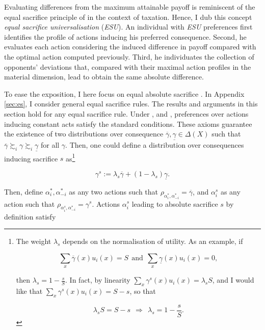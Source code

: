 Evaluating differences from the maximum attainable payoff is reminiscent of the equal sacrifice principle of \cite{mill1885principles} in the context of taxation. Hence, I dub this concept \textit{equal sacrifice universalisation} (\textit{ESU}). An individual with \textit{ESU} preferences first identifies the profile of actions inducing his preferred consequence. Second, he  evaluates each action considering the induced difference in payoff compared with the optimal action computed previously. Third, he individuates the collection of opponents' deviations that, compared with their maximal action profiles in the material dimension, lead to obtain the same absolute difference.

To ease the exposition, I here focus on equal absolute sacrifice \citep{youngDistributiveJusticeTaxation1988}. In Appendix \ref{sec:es}, I consider general equal sacrifice rules. The results and arguments in this section hold for any equal sacrifice rule. Under ,  and , preferences over actions inducing constant acts satisfy the standard \citeauthor{anscombeDefinitionSubjectiveProbability1963} conditions. These axioms guarantee the existence of two distributions over consequence \( \overline{\gamma}, \underline{\gamma} \in \Delta (X) \) such that \( \overline{\gamma} \succsim_i \gamma \succsim_i \underline{\gamma} \) for all \( \gamma \). Then, one could define a distribution over consequences inducing sacrifice \( s \) as\footnote{The weight \( \lambda_s \) depends on the normalisation of utility. As an example, if

	\[
		\sum_{x} \overline{\gamma} (x) u_i (x) = S \: \: \text{and} \: \: \sum_{x} \underline{\gamma} (x) u_i (x) = 0,
	\]

	then \( \lambda_s = 1 - \frac{s}{S} \). In fact, by linearity \( \sum_{x} \gamma^s (x) u_i (x) = \lambda_s S \), and I would like that \( \sum_{x} \gamma^s (x) u_i (x) = S - s \), so that

	\[
		\lambda_s S = S - s \: \: \Rightarrow \: \: \lambda_s = 1 - \frac{s}{S} .
	\]}

\[ \gamma^s := \lambda_s \overline{\gamma} + (1- \lambda_s) \underline{\gamma} .\]

Then, define \( \alpha_i^{*}, \alpha_{-i}^{*} \) as any two actions such that \( \rho_{\alpha_i^{*}, \alpha_{-i}^{*}} = \overline{\gamma} \), and \( \alpha_i^s \) as any action such that \( \rho_{\alpha_i^{s}, \alpha_{-i}^{*}} = \gamma^s \). Actions \( \alpha_i^s \) leading to absolute sacrifice \(s\) by definition satisfy

